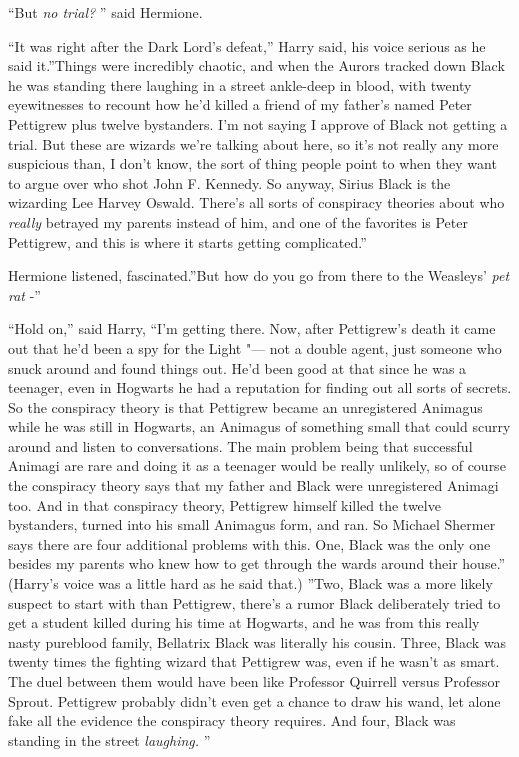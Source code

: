 ``But \emph{no trial?} '' said Hermione.

``It was right after the Dark Lord's defeat,'' Harry said, his voice
serious as he said it.''Things were incredibly chaotic, and when the
Aurors tracked down Black he was standing there laughing in a street
ankle-deep in blood, with twenty eyewitnesses to recount how he'd killed
a friend of my father's named Peter Pettigrew plus twelve bystanders.
I'm not saying I approve of Black not getting a trial. But these are
wizards we're talking about here, so it's not really any more suspicious
than, I don't know, the sort of thing people point to when they want to
argue over who shot John F. Kennedy. So anyway, Sirius Black is the
wizarding Lee Harvey Oswald. There's all sorts of conspiracy theories
about who \emph{really} betrayed my parents instead of him, and one of
the favorites is Peter Pettigrew, and this is where it starts getting
complicated.''

Hermione listened, fascinated.''But how do you go from there to the
Weasleys' \emph{pet rat} -''

``Hold on,'' said Harry, ``I'm getting there. Now, after Pettigrew's
death it came out that he'd been a spy for the Light "--- not a double
agent, just someone who snuck around and found things out. He'd been
good at that since he was a teenager, even in Hogwarts he had a
reputation for finding out all sorts of secrets. So the conspiracy
theory is that Pettigrew became an unregistered Animagus while he was
still in Hogwarts, an Animagus of something small that could scurry
around and listen to conversations. The main problem being that
successful Animagi are rare and doing it as a teenager would be really
unlikely, so of course the conspiracy theory says that my father and
Black were unregistered Animagi too. And in that conspiracy theory,
Pettigrew himself killed the twelve bystanders, turned into his small
Animagus form, and ran. So Michael Shermer says there are four
additional problems with this. One, Black was the only one besides my
parents who knew how to get through the wards around their house.''
(Harry's voice was a little hard as he said that.) ''Two, Black was a
more likely suspect to start with than Pettigrew, there's a rumor Black
deliberately tried to get a student killed during his time at Hogwarts,
and he was from this really nasty pureblood family, Bellatrix Black was
literally his cousin. Three, Black was twenty times the fighting wizard
that Pettigrew was, even if he wasn't as smart. The duel between them
would have been like Professor Quirrell versus Professor Sprout.
Pettigrew probably didn't even get a chance to draw his wand, let alone
fake all the evidence the conspiracy theory requires. And four, Black
was standing in the street \emph{laughing.} ''

